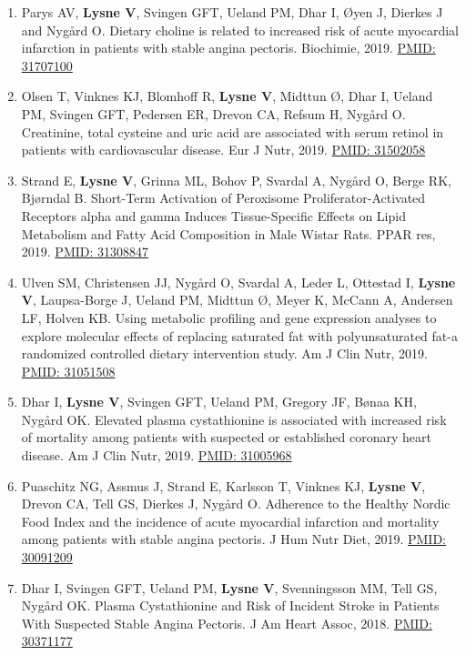 \documentclass[11pt, a4paper]{awesome-cv}
\begin{document}
\begin{enumerate}
\item
  Parys AV, \textbf{Lysne V}, Svingen GFT, Ueland PM, Dhar I, Øyen J, Dierkes J and Nygård O. Dietary choline is related to increased risk of acute myocardial infarction in patients with stable angina pectoris. Biochimie, 2019. \href{https://www.ncbi.nlm.nih.gov/pubmed/31707100}{PMID: 31707100}
\item
  Olsen T, Vinknes KJ, Blomhoff R, \textbf{Lysne V}, Midttun Ø, Dhar I, Ueland PM, Svingen GFT, Pedersen ER, Drevon CA, Refsum H, Nygård O. Creatinine, total cysteine and uric acid are associated with serum retinol in patients with cardiovascular disease. Eur J Nutr, 2019. \href{https://www.ncbi.nlm.nih.gov/pubmed/31502058}{PMID: 31502058}
\item
  Strand E, \textbf{Lysne V}, Grinna ML, Bohov P, Svardal A, Nygård O, Berge RK, Bjørndal B. Short-Term Activation of Peroxisome Proliferator-Activated Receptors alpha and gamma Induces Tissue-Specific Effects on Lipid Metabolism and Fatty Acid Composition in Male Wistar Rats. PPAR res, 2019. \href{https://www.ncbi.nlm.nih.gov/pubmed/31308847}{PMID: 31308847}
\item
  Ulven SM, Christensen JJ, Nygård O, Svardal A, Leder L, Ottestad I, \textbf{Lysne V}, Laupsa-Borge J, Ueland PM, Midttun Ø, Meyer K, McCann A, Andersen LF, Holven KB. Using metabolic profiling and gene expression analyses to explore molecular effects of replacing saturated fat with polyunsaturated fat-a randomized controlled dietary intervention study. Am J Clin Nutr, 2019. \href{https://www.ncbi.nlm.nih.gov/pubmed/31051508}{PMID: 31051508}
\item
  Dhar I, \textbf{Lysne V}, Svingen GFT, Ueland PM, Gregory JF, Bønaa KH, Nygård OK. Elevated plasma cystathionine is associated with increased risk of mortality among patients with suspected or established coronary heart disease. Am J Clin Nutr, 2019. \href{https://www.ncbi.nlm.nih.gov/pubmed/31005968}{PMID: 31005968}
\item
  Puaschitz NG, Assmus J, Strand E, Karlsson T, Vinknes KJ, \textbf{Lysne V}, Drevon CA, Tell GS, Dierkes J, Nygård O. Adherence to the Healthy Nordic Food Index and the incidence of acute myocardial infarction and mortality among patients with stable angina pectoris. J Hum Nutr Diet, 2019. \href{https://www.ncbi.nlm.nih.gov/pubmed/30091209}{PMID: 30091209}
\item
  Dhar I, Svingen GFT, Ueland PM, \textbf{Lysne V}, Svenningsson MM, Tell GS, Nygård OK. Plasma Cystathionine and Risk of Incident Stroke in Patients With Suspected Stable Angina Pectoris. J Am Heart Assoc, 2018. \href{https://www.ncbi.nlm.nih.gov/pubmed/30371177}{PMID: 30371177}

\end{enumerate}
\end{document}

